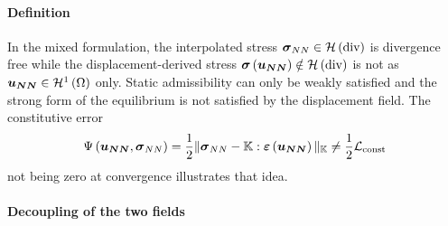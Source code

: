 \paragraph{Definition}
In the mixed formulation, the interpolated stress $\mathcal{\boldsymbol{\sigma}}_{NN} \in \mathcal{H}\left(\text{div}\right)$ is divergence free while the displacement-derived stress $\mathcal{\boldsymbol{\sigma}}\left(\boldsymbol{u_{NN}}\right) \notin \mathcal{H}\left(\text{div}\right)$ is not as $\boldsymbol{u_{NN}}\in \mathcal{H}^1\left(\Omega\right)$ only. Static admissibility can only be weakly satisfied and the strong form of the equilibrium is not satisfied by the displacement field. The constitutive error
\begin{equation}
	\Psi\left(\boldsymbol{u_{NN}},\mathcal{\boldsymbol{\sigma}}_{NN}\right) = \frac{1}{2} \Vert \mathcal{\boldsymbol{\sigma}}_{NN} - \mathbb{K}:\mathcal{\boldsymbol{\varepsilon}}\left(\boldsymbol{u_{NN}}\right) \Vert_{\mathbb{K}} \neq \frac{1}{2} \mathcal{L}_{\text{const}}
	\label{eq:EC}
\end{equation}
not being zero at convergence illustrates that idea. 

\paragraph{Decoupling of the two fields}

